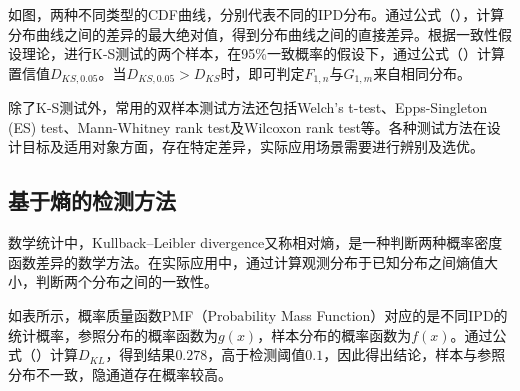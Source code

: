 如图，两种不同类型的CDF曲线，分别代表不同的IPD分布。通过公式（），计算分布曲线之间的差异的最大绝对值，得到分布曲线之间的直接差异。根据一致性假设理论，进行K-S测试的两个样本，在95\%一致概率的假设下，通过公式（）计算置信值$D_{KS,0.05}$。当$D_{KS,0.05}>D_{KS}$时，即可判定$F_{1,n}$与$G_{1,m}$来自相同分布。

除了K-S测试外，常用的双样本测试方法还包括Welch’s t-test、Epps-Singleton (ES) test、Mann-Whitney rank test及Wilcoxon rank test等。各种测试方法在设计目标及适用对象方面，存在特定差异，实际应用场景需要进行辨别及选优。

\subsection{基于熵的检测方法}
\label{chap:backinfo:detect:entropy}

数学统计中，Kullback–Leibler divergence又称相对熵，是一种判断两种概率密度函数差异的数学方法。在实际应用中，通过计算观测分布于已知分布之间熵值大小，判断两个分布之间的一致性。



如表所示，概率质量函数PMF（Probability Mass Function）对应的是不同IPD的统计概率，参照分布的概率函数为$g(x)$，样本分布的概率函数为$f(x)$。通过公式（）计算$D_{KL}$，得到结果$0.278$，高于检测阈值$0.1$，因此得出结论，样本与参照分布不一致，隐通道存在概率较高。

